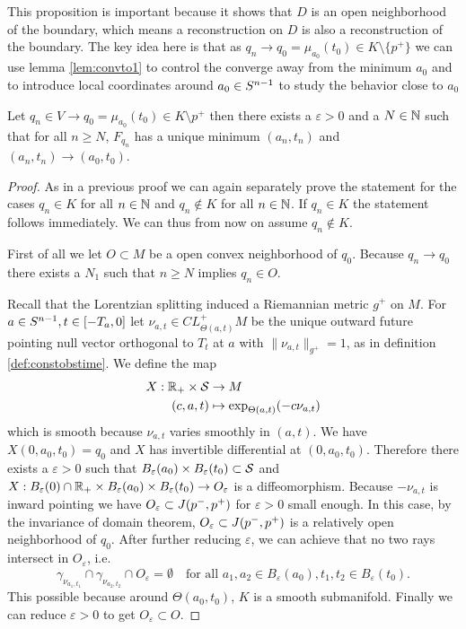 This proposition is important because it shows that $D$ is an open neighborhood of the boundary, which means a reconstruction on $D$ is also a reconstruction of the boundary. The key idea here is that as $q_n \to q_0=\mu_{a_0}(t_0)\in K \setminus \{p^+\}$ we can use lemma \ref{lem:convto1} to control the converge away from the minimum $a_0$ and to introduce local coordinates around $a_0\in {S^{n-1}}$ to study the behavior close to $a_0$
\begin{proposition}\label{prop:boundarymin}
    Let $q_n\in V\to q_0=\mu_{a_0}(t_0)\in K\setminus p^+$ then there exists a $\varepsilon>0$ and a $N\in \mathbb{N}$ such that for all $n\ge N$, $F_{q_n}$ has a unique minimum $(a_n,t_n)$ and $(a_n,t_n)\to (a_0,t_0)$.
\end{proposition}
\begin{proof}
    As in a previous proof we can again separately prove the statement for the cases $q_n\in K$ for all $n\in \mathbb{N}$ and $q_n \notin K$ for all $n\in \mathbb{N}$. If $q_n \in K$ the statement follows immediately. We can thus from now on assume $q_n \notin K$.

    First of all we let $O\subset M$ be a open convex neighborhood of $q_0$. Because $q_n \to q_0$ there exists a $N_1$ such that $n\ge N$ implies $q_n \in O$.

    Recall that the Lorentzian splitting induced a Riemannian metric $g^+$ on $M$. For $a\in {S^{n-1}}, t\in [-T_a,0]$ let $\nu_{a,t}\in CL^+_{\Theta(a,t)}M$ be the unique outward future pointing null vector orthogonal to $T_t$ at $a$ with $\lVert \nu_{a,t} \rVert_{g^+}=1$, as in definition \ref{def:constobstime}. We define the map 
    \begin{align*}
        X:\mathbb{R}_+\times {\mathcal{S}} &\to M \\
        (c,a,t)&\mapsto \exp_{\Theta(a,t)}(-c\nu_{a,t})
    \end{align*} which is smooth because $\nu_{a,t}$ varies smoothly in $(a,t)$. We have $X(0,a_0,t_0)=q_0$ and $X$ has invertible differential at $(0,a_0,t_0)$. Therefore there exists a $\varepsilon>0$ such that $B_\varepsilon(a_0) \times B_\varepsilon(t_0)\subset {\mathcal{S}}$ and $X:B_\varepsilon(0)\cap \mathbb{R}_+ \times B_\varepsilon(a_0) \times B_\varepsilon(t_0) \to O_\varepsilon$ is a diffeomorphism. Because $-\nu_{a,t}$ is inward pointing we have $O_\varepsilon\subset J(p^-,p^+)$ for $\varepsilon>0$ small enough. In this case, by the invariance of domain theorem, $O_\varepsilon\subset J(p^-,p^+)$ is a relatively open neighborhood of $q_0$. After further reducing $\varepsilon$, we can achieve that no two rays intersect in $O_\varepsilon$, i.e. 
    \[
        \gamma_{\nu_{a_1,t_1}} \cap \gamma_{\nu_{a_2,t_2}} \cap O_\varepsilon=\emptyset \quad  \text{for all } a_1,a_2\in B_\varepsilon(a_0), t_1,t_2 \in B_\varepsilon(t_0).
    \] This possible because around $\Theta(a_0,t_0)$, $K$ is a smooth submanifold.
    Finally we can reduce $\varepsilon>0$ to get $O_\varepsilon\subset O$.
    

\end{proof}
